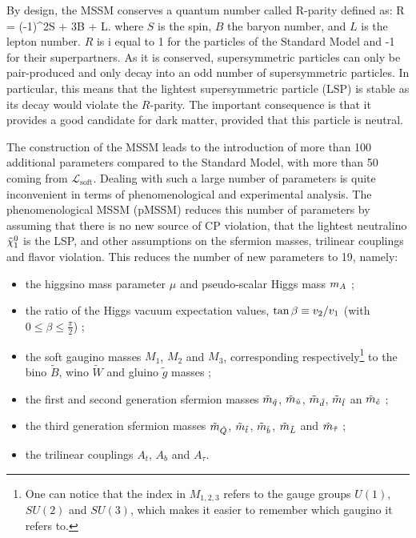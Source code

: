         By design, the MSSM conserves a quantum number called R-parity defined as:
        {
            R = (-1)^{2S + 3B + L}.
        }
        where $S$ is the spin, $B$ the baryon number, and $L$ is the lepton number. $R$ is i
        equal to 1 for the particles of the Standard Model and -1 for their superpartners.
        As it is conserved, supersymmetric particles can only be
        pair-produced and only decay into an odd number of supersymmetric particles. In
        particular, this means that the lightest supersymmetric particle (LSP) is stable as
        its decay would violate the $R$-parity. The important consequence is that it provides
        a good candidate for dark matter, provided that this particle is neutral.

        The construction of the MSSM leads to the introduction of more than 100 additional
        parameters compared to the Standard Model, with more than 50 coming from $\mathcal{L}_\text{soft}$.
        Dealing with such a large number of
        parameters is quite inconvenient in terms of phenomenological and experimental analysis.
        The phenomenological MSSM (pMSSM) reduces this number of parameters by assuming that
        there is no new source of CP violation, that the lightest neutralino $\tilde{\chi}_1^0$
        is the LSP, and other assumptions on the sfermion masses, trilinear couplings and
        flavor violation. This reduces the number of new parameters to 19, namely:
        \begin{itemize}
            \item the higgsino mass parameter $\mu$ and pseudo-scalar Higgs mass $m_{A}$ ;
            \item the ratio of the Higgs vacuum expectation values, $\text{tan}\, \beta \equiv v_2 / v_1$ (with $0 \leq \beta \leq \frac{\pi}{2}$) ;
            \item the soft gaugino masses $M_1$, $M_2$ and $M_3$, corresponding respectively\footnote{One can notice that the index in $M_{1,2,3}$ refers to the gauge groups $U(1)$, $SU(2)$ and $SU(3)$, which makes it easier to remember which gaugino it refers to.} to the bino $\tilde{B}$, wino $\tilde{W}$ and gluino $\tilde{g}$ masses ;
            \item the first and second generation sfermion masses $\tilde{m}_{\tilde{q}}$, $\tilde{m}_{\tilde{u}}$, $\tilde{m}_{\tilde{d}}$, $\tilde{m}_{\tilde{l}}$ an $\tilde{m}_{\tilde{e}}$ ;
            \item the third generation sfermion masses $\tilde{m}_{\tilde{Q}}$, $\tilde{m}_{\tilde{t}}$, $\tilde{m}_{\tilde{b}}$, $\tilde{m}_{\tilde{L}}$ and $\tilde{m}_{\tilde{\tau}}$ ;
            \item the trilinear couplings $A_t$, $A_b$ and $A_\tau$.
        \end{itemize}
